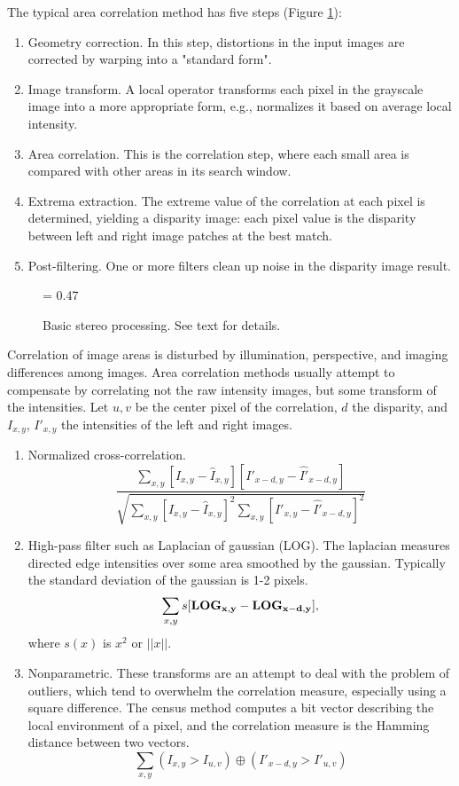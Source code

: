 \documentclass[twocolumn,oneside]{book}
\begin{document}
The typical area correlation method has five steps (Figure
\ref{fig23.stereo-processing}): 
\begin{enumerate}
\item Geometry correction.  In this step, distortions in the input
images are corrected by warping into a "standard form". 
\item Image transform.  A local operator transforms each pixel in the
grayscale image into a more appropriate form, e.g., normalizes it
based on average local intensity. 
\item Area correlation.  This is the correlation step, where each
small area is compared with other areas in its search window. 
\item Extrema extraction.  The extreme value of the correlation at
each pixel is determined, yielding a disparity image: each pixel value
is the disparity between left and right image patches at the best
match. 
\item Post-filtering.  One or more filters clean up noise in the
disparity image result. 
\end{enumerate}

\begin{figure}
{\epsfxsize = 0.47\textwidth {}}
\caption{
Basic stereo processing.  See text for details.
\label{fig23.stereo-processing}}

\end{figure}


Correlation of image areas is disturbed by illumination, perspective,
and imaging differences among images.  Area correlation methods
usually attempt to compensate by correlating not the raw intensity
images, but some transform of the intensities.  Let $u,v$ be the
center pixel of the correlation, $d$ the disparity, and $I_{x,y}$,
$I'_{x,y}$ the intensities of the left and right images.

\begin{enumerate}
\item Normalized cross-correlation. 
$$
\frac
{\sum_{x,y}[I_{x,y}-\hat{I}_{x,y}][I'_{x-d,y}-\hat{I'}_{x-d,y}]}
{\sqrt{ \sum_{x,y}[I_{x,y}-\hat{I}_{x,y}]^2 \sum_{x,y}[I'_{x,y}-\hat{I'}_{x-d,y}]^2 }}
$$

\item High-pass filter such as Laplacian of gaussian (LOG).  The
laplacian measures directed edge intensities over some area smoothed
by the gaussian.  Typically the standard deviation of the gaussian is
1-2 pixels.  
$$
\sum_{x,y}s[\bf{LOG}_{x,y}-\bf{LOG}_{x-d,y}],
$$
where $s(x)$ is $x^2$ or $||x||$.

\item Nonparametric.  These transforms are an attempt to deal with
the problem of outliers, which tend to overwhelm the correlation
measure, especially using a square difference.  The census method \cite{zabih94} 
computes a bit vector describing the local environment of a pixel, and
the correlation measure is the Hamming distance between two vectors.
$$
\sum_{x,y}(I_{x,y} > I_{u,v}) \oplus (I'_{x-d,y} > I'_{u,v})
$$
\end{enumerate}
\end{document}
